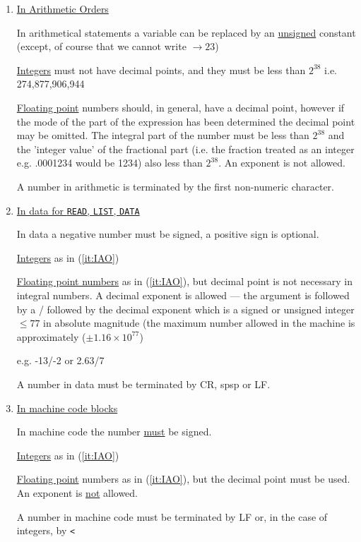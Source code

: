 \documentclass[10pt, a4paper, oneside]{article}
\newcommand{\myuline}[1]{\uline{#1}}
\newcommand{\mytt}[1]{\texttt{\scriptsize #1}}
\newcommand{\mytt}[1]{\texttt{\small #1}}
\begin{document}
\begin{multicols}{2}
\renewcommand{\labelenumi}{(\alph{enumi})}
\begin{enumerate}
\def\theenumi{\alph{enumi}}

\item\label{it:IAO} \myuline{In Arithmetic Orders}

In arithmetical statements a variable can be
replaced by an \myuline{unsigned} constant (except, of course
that we cannot write $\rightarrow 23$)

\myuline{Integers} must not have decimal points, and they must
be less than $2^{38}$ i.e. 274,877,906,944

\myuline{Floating point} numbers should, in general, have a
decimal point, however if the mode of the part of the
expression has been determined the decimal point may
be omitted. The integral part of the number must be less
than $2^{38}$ and the 'integer value' of the fractional part
(i.e. the fraction treated as an integer e.g. .0001234
would be 1234) also less than $2^{38}$.  An exponent is not
allowed.

A number in arithmetic is terminated by the first
non-numeric character.

\item \myuline{In data for \mytt{READ}, \mytt{LIST}, \mytt{DATA}}

In data a negative number must be signed, a
positive sign is optional.

\myuline{Integers} as in (\ref{it:IAO})

\myuline{Floating point numbers} as in (\ref{it:IAO}), but decimal point is
not necessary in integral numbers.  A decimal exponent
is allowed — the argument is followed by a / followed
by the decimal exponent which is a signed or unsigned
integer $\leqslant 77$ in absolute magnitude (the maximum number
allowed in the machine is approximately ($\pm 1.16 \times 10^{77}$)

e.g. -13/-2 or 2.63/7

A number in data must be terminated by CR, spsp or
LF.

\item \myuline{In machine code blocks}

In machine code the number \myuline{must} be signed.

\myuline{Integers} as in (\ref{it:IAO})

\myuline{Floating point} numbers as in (\ref{it:IAO}), but the decimal
point must be used.  An exponent is \myuline{not} allowed.

A number in machine code must be terminated by LF
or, in the case of integers, by \mytt{<}
\end{enumerate}



\end{multicols}
\end{document}
